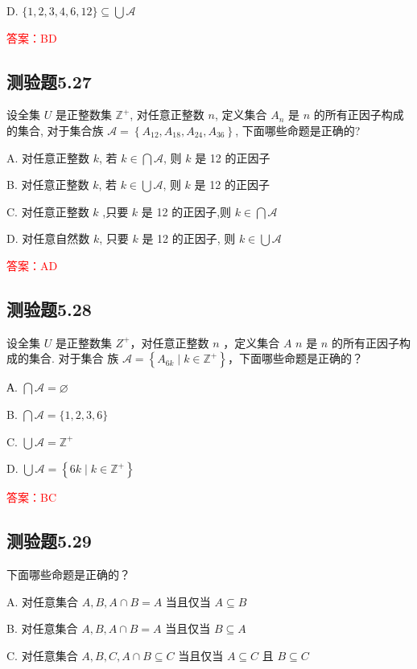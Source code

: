 \documentclass[UTF8, heading=true]{ctexart}
\begin{document}
D. $\{1,2,3,4,6,12\} \subseteq \bigcup \mathcal{A}$

\textcolor{red}{答案：BD}

\subsection{测验题5.27}

设全集 $U$ 是正整数集 $\mathbb{Z}^{+}$, 对任意正整数 $n$, 定义集合 $A_n$ 是 $n$ 的所有正因子构成的集合, 对于集合族 $\mathcal{A}=\left\{A_{12}, A_{18}, A_{24}, A_{36}\right\}$, 下面哪些命题是正确的?

A. 对任意正整数 $k$, 若 $k \in \bigcap \mathcal{A}$, 则 $k$ 是 12 的正因子

B. 对任意正整数 $k$, 若 $k \in \bigcup \mathcal{A}$, 则 $k$ 是 12 的正因子

C. 对任意正整数 $k$ ,只要 $k$ 是 12 的正因子,则 $k \in \bigcap \mathcal{A}$

D. 对任意自然数 $k$, 只要 $k$ 是 12 的正因子, 则 $k \in \bigcup \mathcal{A}$

\textcolor{red}{答案：AD}

\subsection{测验题5.28}

设全集 $U$ 是正整数集 $Z^{+}$，对任意正整数 $n$ ，定义集合 $A$ $n$ 是 $n$ 的所有正因子构成的集合. 对于集合
族 $\mathcal{A}=\left\{A_{6 k} \mid k \in \mathbb{Z}^{+}\right\}$，下面哪些命题是正确的？

А. $\bigcap \mathcal{A}=\varnothing$

B. $\bigcap \mathcal{A}=\{1,2,3,6\}$

C. $\bigcup \mathcal{A}=\mathbb{Z}^{+}$

D. $\bigcup \mathcal{A}=\left\{6 k \mid k \in \mathbb{Z}^{+}\right\}$

\textcolor{red}{答案：BC}



\subsection{测验题5.29}
下面哪些命题是正确的？

A. 对任意集合 $A, B, A \cap B=A$ 当且仅当 $A \subseteq B$

B. 对任意集合 $A, B, A \cap B=A$ 当且仅当 $B \subseteq A$

C. 对任意集合 $A, B, C, A \cap B \subseteq C$ 当且仅当 $A \subseteq C$ 且 $B \subseteq C$
\end{document}
